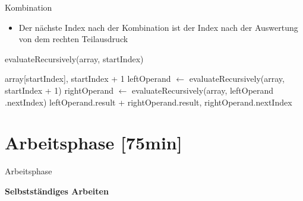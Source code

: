 \documentclass{../tuda-beamer}
\begin{document}
    \begin{frame}{Kombination}
        \begin{itemize}
            \item Der nächste Index nach der Kombination ist der Index nach der Auswertung von
            dem rechten Teilausdruck
        \end{itemize}

        \begin{algorithm}[H]
            \caption{evaluateRecursively(array, startIndex)}
            \begin{algorithmic}[1]
                    \State \Return array[startIndex], startIndex + 1
                \Else
                    \State leftOperand \(\leftarrow\) evaluateRecursively(array, startIndex + 1)
                    \State rightOperand \(\leftarrow\) evaluateRecursively(array, leftOperand
                    .nextIndex)
                    \State \Return leftOperand.result + rightOperand.result, rightOperand.nextIndex
                \EndIf
            \end{algorithmic}
        \end{algorithm}
    \end{frame}

    \begin{frame}[c]
        
    \end{frame}


    \section{Arbeitsphase [75min]}
    \begin{frame}[c]{Arbeitsphase}
        \begin{center}
            \textbf{\LARGE Selbstständiges Arbeiten}
        \end{center}
    \end{frame}
\end{document}
